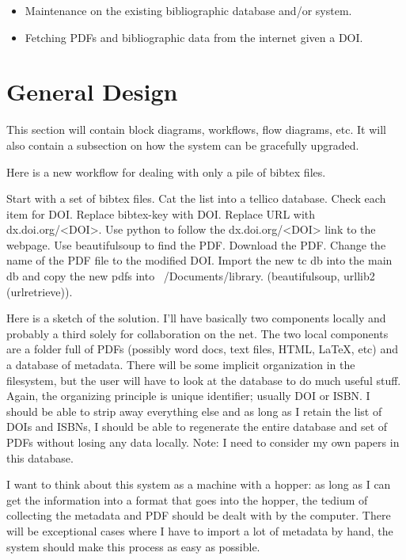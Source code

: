 \documentclass[letterpaper,12pt]{article}
\begin{document}
\begin{itemize}
\item Maintenance on the existing bibliographic database and/or system.
\item Fetching PDFs and bibliographic data from the internet given a DOI.
\end{itemize}









\section{General Design}
This section will contain block diagrams, workflows, flow diagrams, etc. It will also contain a subsection on how the system can be gracefully upgraded.

Here is a new workflow for dealing with only a pile of bibtex files. 

Start with a set of bibtex files. Cat the list into a tellico database. Check each item for DOI. Replace bibtex-key with DOI. Replace URL with dx.doi.org/<DOI>. Use python to follow the dx.doi.org/<DOI> link to the webpage. Use beautifulsoup to find the PDF. Download the PDF. Change the name of the PDF file to the modified DOI. Import the new tc db into the main db and copy the new pdfs into ~/Documents/library. (beautifulsoup, urllib2 (urlretrieve)).

Here is a sketch of the solution.
I'll have basically two components locally and probably a third solely for collaboration on the net. The two local components are a folder full of PDFs (possibly word docs, text files, HTML, \LaTeX, etc) and a database of metadata. There will be some implicit organization in the filesystem, but the user will have to look at the database to do much useful stuff. Again, the organizing principle is unique identifier; usually DOI or ISBN. I should be able to strip away everything else and as long as I retain the list of DOIs and ISBNs, I should be able to regenerate the entire database and set of PDFs without losing any data locally. Note: I need to consider my own papers in this database.

I want to think about this system as a machine with a hopper: as long as I can get the information into a format that goes into the hopper, the tedium of collecting the metadata and PDF should be dealt with by the computer. There will be exceptional cases where I have to import a lot of metadata by hand, the system should make this process as easy as possible.
\end{document}
